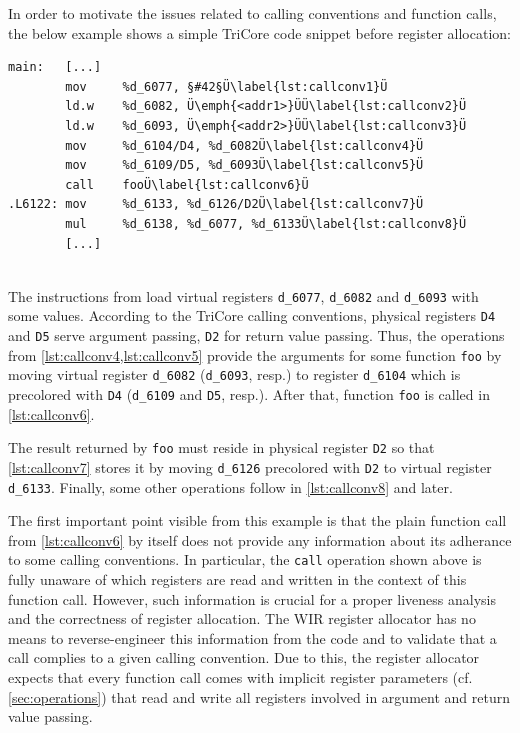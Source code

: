 In order to motivate the issues related to calling conventions and function calls, the below example shows a simple TriCore code snippet before register allocation: \\
\begin{lstlisting}[style=code,float=!h,aboveskip=-0.8 \baselineskip,belowskip=-0.8 \baselineskip]
main:   [...]
        mov     %d_6077, §#42§Ü\label{lst:callconv1}Ü
        ld.w    %d_6082, Ü\emph{<addr1>}ÜÜ\label{lst:callconv2}Ü
        ld.w    %d_6093, Ü\emph{<addr2>}ÜÜ\label{lst:callconv3}Ü
        mov     %d_6104/D4, %d_6082Ü\label{lst:callconv4}Ü
        mov     %d_6109/D5, %d_6093Ü\label{lst:callconv5}Ü
        call    fooÜ\label{lst:callconv6}Ü
.L6122: mov     %d_6133, %d_6126/D2Ü\label{lst:callconv7}Ü
        mul     %d_6138, %d_6077, %d_6133Ü\label{lst:callconv8}Ü
        [...]
\end{lstlisting}
\\
The instructions from  load virtual registers \texttt{d\_6077}, \texttt{d\_6082} and \texttt{d\_6093} with some values.
According to the TriCore calling conventions, physical registers \texttt{D4} and \texttt{D5} serve argument passing, \texttt{D2} for return value passing.
Thus, the operations from \cref{lst:callconv4,lst:callconv5} provide the arguments for some function \texttt{foo} by moving virtual register \texttt{d\_6082} (\texttt{d\_6093}, resp.) to register \texttt{d\_6104} which is precolored with \texttt{D4} (\texttt{d\_6109} and \texttt{D5}, resp.).
After that, function \texttt{foo} is called in \cref{lst:callconv6}.

The result returned by \texttt{foo} must reside in physical register \texttt{D2} so that \cref{lst:callconv7} stores it by moving \texttt{d\_6126} precolored with \texttt{D2} to virtual register \texttt{d\_6133}.
Finally, some other operations follow in \cref{lst:callconv8} and later.

The first important point visible from this example is that the plain function call from \cref{lst:callconv6} by itself does not provide any information about its adherance to some calling conventions.
In particular, the \texttt{call} operation shown above is fully unaware of which registers are read and written in the context of this function call.
However, such information is crucial for a proper liveness analysis and the correctness of register allocation.
The \gls{WIR} register allocator has no means to reverse-engineer this information from the code and to validate that a call complies to a given calling convention.
Due to this, the register allocator expects that every function call comes with implicit register parameters (cf. \cref{sec:operations}) that read and write all registers involved in argument and return value passing.

